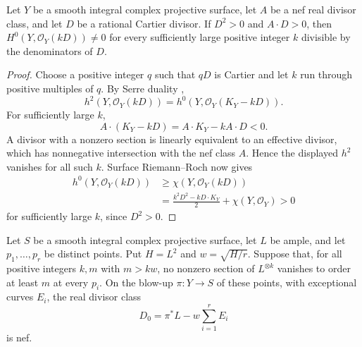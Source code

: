 \begin{lemma}
\label{lem:positive-square}
Let $Y$ be a smooth integral complex projective surface, let $A$ be a
nef real divisor class, and let $D$ be a rational Cartier divisor.
If $D^2>0$ and $A\cdot D>0$, then
$H^0(Y,\mathcal O_Y(kD))\ne0$ for every sufficiently large positive
integer $k$ divisible by the denominators of $D$.
\end{lemma}

\begin{proof}
Choose a positive integer $q$ such that $qD$ is Cartier and let
$k$ run through positive multiples of $q$. By Serre duality \cite[Tag 0FVV, Lemma 48.27.1(6)--(7)]{Stacks},
\[
 h^2(Y,\mathcal O_Y(kD))
   =h^0(Y,\mathcal O_Y(K_Y-kD)).
\]
For sufficiently large $k$,
\[
 A\cdot(K_Y-kD)=A\cdot K_Y-kA\cdot D<0.
\]
A divisor with a nonzero section is linearly equivalent to an
effective divisor, which has nonnegative intersection with the nef
class $A$. Hence the displayed $h^2$ vanishes for all such $k$.
Surface Riemann--Roch \cite[Tag 02UO]{Stacks} now gives
\[
 \begin{split}
 h^0(Y,\mathcal O_Y(kD))
 &\ge \chi(Y,\mathcal O_Y(kD))\\
 &=\frac{k^2D^2-kD\cdot K_Y}{2}+\chi(Y,\mathcal O_Y)>0
 \end{split}
\]
for sufficiently large $k$, since $D^2>0$.
\end{proof}

\begin{proposition}
\label{prop:homogeneous-nef}
Let $S$ be a smooth integral complex projective surface, let $L$ be
ample, and let $p_1,\ldots,p_r$ be distinct points. Put
$H=L^2$ and $w=\sqrt{H/r}$. Suppose that, for all positive integers
$k,m$ with $m>kw$, no nonzero section of $L^{\otimes k}$ vanishes to
order at least $m$ at every $p_i$. On the blow-up
$\pi:Y\to S$ of these points, with exceptional curves $E_i$, the real
divisor class
\[
 D_0=\pi^*L-w\sum_{i=1}^rE_i
\]
is nef.
\end{proposition}

